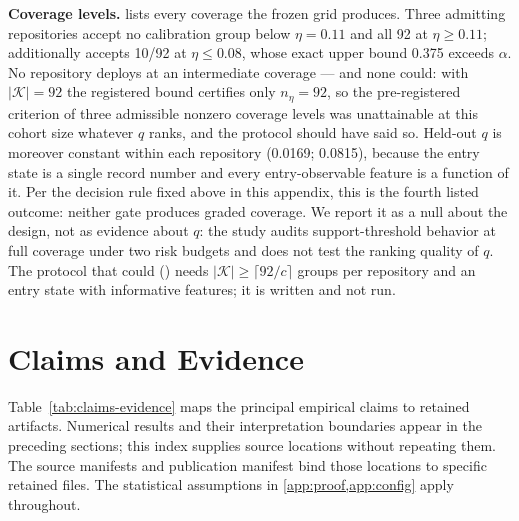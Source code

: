 \textbf{Coverage levels.}  lists every
coverage the frozen grid produces. Three admitting repositories accept no
calibration group below $\eta=0.11$ and all 92 at $\eta\ge 0.11$;
 additionally accepts 10/92 at $\eta\le 0.08$, whose
exact upper bound 0.375 exceeds $\alpha$. No repository deploys at an
intermediate coverage --- and none could: with $|\mathcal{K}|=92$ the
registered bound certifies only $n_\eta=92$, so the pre-registered criterion of
three admissible nonzero coverage levels was unattainable at this cohort size
whatever $q$ ranks, and the protocol should have said so. Held-out $q$ is
moreover constant within each repository (0.0169; 0.0815), because the entry
state is a single record number and every entry-observable feature is a
function of it. Per the decision rule fixed above in this appendix, this is the
fourth listed outcome: neither gate produces graded coverage. We report it as a
null about the design, not as evidence about $q$: the study audits
support-threshold behavior at full coverage under two risk budgets and does not
test the ranking quality of $q$. The protocol that could
() needs
$|\mathcal{K}|\ge\lceil 92/c\rceil$ groups per repository and an entry state
with informative features; it is written and not run.









\section{Claims and Evidence}
\label{app:claims}

Table~\ref{tab:claims-evidence} maps the principal empirical claims to retained
artifacts. Numerical results and their interpretation boundaries appear in the
preceding sections; this index supplies source locations without repeating
them. The source manifests and publication manifest bind those locations to
specific retained files. The statistical assumptions in \cref{app:proof,app:config}
apply throughout.



